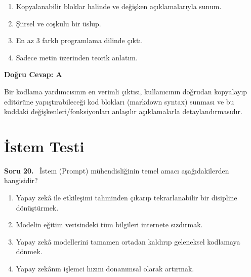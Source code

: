 \documentclass[11pt,a4paper,openany]{book}
\begin{document}
\begin{enumerate}[label=\Alph*), leftmargin=25pt, topsep=4pt, itemsep=2pt]
        \item Kopyalanabilir bloklar halinde ve değişken açıklamalarıyla sunum.
        \item Şiirsel ve coşkulu bir üslup.
        \item En az 3 farklı programlama dilinde çıktı.
        \item Sadece metin üzerinden teorik anlatım.
\end{enumerate}

\vspace{4pt}
\begin{tcolorbox}[title=Cevap ve Açıklama, colback=gray!3!white, colframe=primarycolor!90!black, arc=2mm, fonttitle=\bfseries\sffamily, top=6pt, bottom=6pt]
    \textbf{Doğru Cevap: A}

    \vspace{2pt}
    Bir kodlama yardımcısının en verimli çıktısı, kullanıcının doğrudan kopyalayıp editörüne yapıştırabileceği kod blokları (markdown syntax) sunması ve bu koddaki değişkenleri/fonksiyonları anlaşılır açıklamalarla detaylandırmasıdır.
\end{tcolorbox}
\vspace{10pt}

\newpage
\section{İstem Testi}
\needspace{5cm}
\vspace{8pt}
\noindent\textbf{\large\sffamily Soru 20.} \ İstem (Prompt) mühendisliğinin temel amacı aşağıdakilerden hangisidir?

\begin{enumerate}[label=\Alph*), leftmargin=25pt, topsep=4pt, itemsep=2pt]
        \item Yapay zekâ ile etkileşimi tahminden çıkarıp tekrarlanabilir bir disipline dönüştürmek.
        \item Modelin eğitim verisindeki tüm bilgileri internete sızdırmak.
        \item Yapay zekâ modellerini tamamen ortadan kaldırıp geleneksel kodlamaya dönmek.
        \item Yapay zekânın işlemci hızını donanımsal olarak artırmak.
\end{enumerate}
\end{document}
